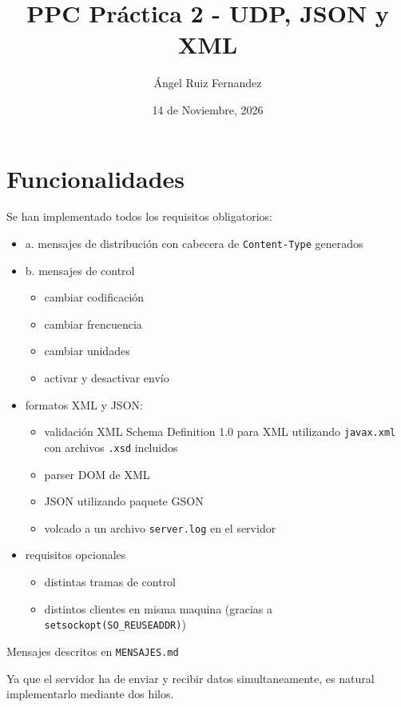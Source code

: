 \documentclass[12pt]{article}
\title{PPC Práctica 2 - UDP, JSON y XML}
\date{14 de Noviembre, 2026}
\author{Ángel Ruiz Fernandez}
\begin{document}
    \maketitle
    \pagebreak

    \tableofcontents
    \pagebreak

    \section{Funcionalidades}

    Se han implementado todos los requisitos obligatorios:

    \begin{itemize}
    \item a. mensajes de distribución con cabecera de \texttt{Content-Type} generados
    \item b. mensajes de control
    \begin{itemize}
        \item cambiar codificación
        \item cambiar frencuencia
        \item cambiar unidades
        \item activar y desactivar envío
    \end{itemize}
    \item formatos XML y JSON:
    \begin{itemize}
        \item validación XML Schema Definition 1.0 para XML utilizando \texttt{javax.xml} con archivos \texttt{.xsd} incluidos
        \item parser DOM de XML
        \item JSON utilizando paquete GSON
        \item volcado a un archivo \texttt{server.log} en el servidor
    \end{itemize}
    \item requisitos opcionales
    \begin{itemize}
        \item distintas tramas de control
        \item distintos clientes en misma maquina (gracias a \texttt{setsockopt(SO\_REUSEADDR)})
    \end{itemize}
    \end{itemize}

    Mensajes descritos en \texttt{MENSAJES.md}

    Ya que el servidor ha de enviar y recibir datos simultaneamente, es natural implementarlo
    mediante dos hilos.
\end{document}
